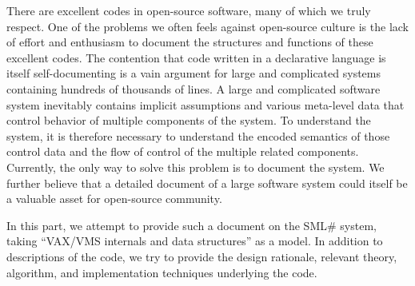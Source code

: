 \documentclass{jbook}
\newcommand{\smlsharp}{SML\#}
\begin{document}
	There are excellent codes in open-source software, many of which
we truly respect. 
	One of the problems we often feels against open-source culture
is the lack of effort and enthusiasm to document the structures and
functions of these excellent codes.
	The contention that code written in a declarative language is 
itself self-documenting is a vain argument for large and complicated
systems containing hundreds of thousands of lines.
	A large and complicated software system inevitably contains
implicit assumptions and various meta-level data that control behavior
of multiple components of the system.
	To understand the system, it is therefore necessary to understand
the encoded semantics of those control data and the flow of 
control of the multiple related components.
	Currently, the only way to solve this problem is to document the
system. 
	We further believe that a detailed document of a large software
system could itself be a valuable asset for open-source community.

	In this part, we attempt to provide such a document on the
\smlsharp{} system, taking ``VAX/VMS internals and data structures''
\cite{Kenah:1984:VID:225} as a model.
	In addition to descriptions of the code, we try to provide
the design rationale, relevant theory, algorithm, and implementation
techniques underlying the code.
\fi%
\end{document}
